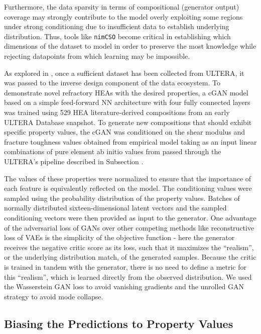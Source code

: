 Furthermore, the data sparsity in terms of compositional (generator output) coverage may strongly contribute to the model overly exploiting some regions under strong conditioning due to insufficient data to establish underlying distribution. Thus, tools like \texttt{nimCSO} become critical in establishing which dimensions of the dataset to model in order to preserve the most knowledge while rejecting datapoints from which learning may be impossible.

As explored in \citet{Debnath2021GenerativeAlloys}, once a sufficient dataset has been collected from ULTERA, it was passed to the inverse design component of the data ecosystem. To demonstrate novel refractory HEAs with the desired properties, a cGAN model based on a simple feed-forward NN architecture with four fully connected layers was trained using 529 HEA literature-derived compositions from an early ULTERA Database snapshot. To generate new compositions that should exhibit specific property values, the cGAN was conditioned on the shear modulus and fracture toughness values obtained from empirical model taking as an input linear combinations of pure element ab initio values from \citet{Chong2021CorrelationAlloys} passed through the ULTERA's pipeline described in Subsection \label{ultera:ssec:autolc}.

The values of these properties were normalized to ensure that the importance of each feature is equivalently reflected on the model. The conditioning values were sampled using the probability distribution of the property values. Batches of normally distributed sixteen-dimensional latent vectors and the sampled conditioning vectors were then provided as input to the generator. One advantage of the adversarial loss of GANs over other competing methods like reconstructive loss of VAEs is the simplicity of the objective function - here the generator receives the negative critic score as its loss, such that it maximizes the “realism”, or the underlying distribution match, of the generated samples. Because the critic is trained in tandem with the generator, there is no need to define a metric for this “realism”, which is learned directly from the observed distribution. We used the Wasserstein GAN \cite{Arjovsky2017WassersteinNetworks} loss to avoid vanishing gradients and the unrolled GAN \cite{Metz2016UnrolledNetworks} strategy to avoid mode collapse.

\subsection{Biasing the Predictions to Property Values} \label{inverse:ssec:propbias}

